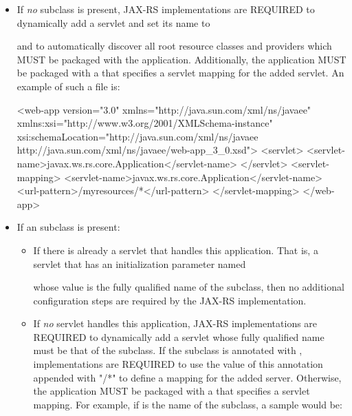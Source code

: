 \begin{itemize}
\item If {\em no}  subclass is present, JAX-RS implementations are REQUIRED to dynamically add a servlet and set its name to
\begin{quote}\end{quote} and to automatically discover all root resource classes and providers which MUST be packaged with the application. Additionally, the application MUST be packaged with a  that specifies a servlet mapping for the added servlet. An example of such a  file is:

\begin{listing}{1}
<web-app version="3.0" xmlns="http://java.sun.com/xml/ns/javaee" 
    xmlns:xsi="http://www.w3.org/2001/XMLSchema-instance" 
    xsi:schemaLocation="http://java.sun.com/xml/ns/javaee 
        http://java.sun.com/xml/ns/javaee/web-app_3_0.xsd">
    <servlet>
        <servlet-name>javax.ws.rs.core.Application</servlet-name>
    </servlet>
    <servlet-mapping>
        <servlet-name>javax.ws.rs.core.Application</servlet-name>
        <url-pattern>/myresources/*</url-pattern>
    </servlet-mapping>
</web-app>
\end{listing} 

\item If an  subclass is present:

\begin{itemize}
\item If there is already a servlet that handles this application. That is, a servlet that has an initialization parameter named
\begin{quote}\end{quote}  whose value is the fully qualified name of the  subclass, then no additional configuration steps are required by the JAX-RS implementation.

\item If {\em no} servlet handles this application, JAX-RS implementations are REQUIRED to dynamically add a servlet whose fully qualified name must be that of the  subclass. If the  subclass is annotated with \ApplicationPath, implementations are REQUIRED to use the value of this annotation appended with "/*" to define a mapping for the added server. Otherwise, the application MUST be packaged with a  that specifies a servlet mapping. For example, if  is the name of the  subclass, a sample  would be:


\end{itemize}
\end{itemize}
